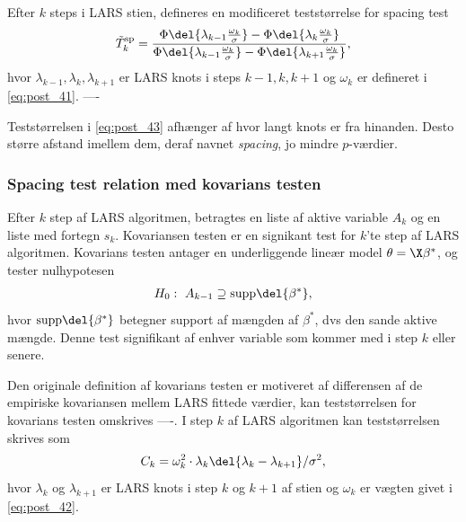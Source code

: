 \begin{thm}
Efter \(k\) steps i LARS stien, defineres en modificeret teststørrelse for spacing test
\begin{align}
\tilde{T}_k^\text{sp}= \frac{\Phi \del{\lambda_{k-1} \frac{\omega_k}{\sigma}} - \Phi \del{\lambda_{k} \frac{\omega_k}{\sigma}}}{\Phi \del{\lambda_{k-1} \frac{\omega_k}{\sigma}} - \Phi \del{\lambda_{k+1} \frac{\omega_k}{\sigma}}}, \label{eq:post_43}
\end{align}
hvor \(\lambda_{k-1}, \lambda_k, \lambda_{k+1}\) er LARS knots i steps \(k-1, k, k+1\) og \(\omega_k\) er defineret i \eqref{eq:post_41}.
----
\end{thm}

Teststørrelsen i \eqref{eq:post_43} afhænger af hvor langt knots er fra hinanden.
Desto større afstand imellem dem, deraf navnet \textit{spacing}, jo mindre \(p\)-værdier.



\subsubsection{Spacing test relation med kovarians testen}
Efter \(k\) step af LARS algoritmen, betragtes en liste af aktive variable \(A_k\) og en liste med fortegn \(s_k\).
Kovariansen testen er en signikant test for \(k\)'te step af LARS algoritmen.
Kovarians testen antager en underliggende lineær model \(\theta=\X \beta^*\), og tester nulhypotesen
\begin{align*}
H_0: \ A_{k-1} \supseteq \text{supp} \del{\beta^*},
\end{align*}
hvor \(\text{supp} \del{\beta^*}\) betegner support af mængden af \(\beta^*\), dvs den sande aktive mængde.
Denne test signifikant af enhver variable som kommer med i step \(k\) eller senere.

Den originale definition af kovarians testen er motiveret af differensen af de empiriske kovariansen mellem LARS fittede værdier, kan teststørrelsen for kovarians testen omskrives ----.
I step \(k\) af LARS algoritmen kan teststørrelsen skrives som
\begin{align}
C_k = \omega_k^2 \cdot \lambda_k \del{\lambda_k - \lambda_{k+1}} / \sigma^2, \label{eq:post_44}
\end{align}
hvor \(\lambda_k\) og \(\lambda_{k+1}\) er LARS knots i step \(k\) og \(k+1\) af stien og \(\omega_k\) er vægten givet i \eqref{eq:post_42}.


